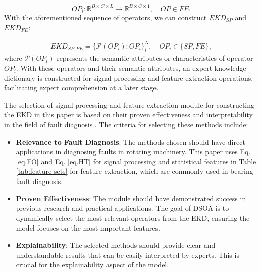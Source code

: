 \documentclass[lettersize,journal]{IEEEtran}
\begin{document}
\begin{equation}
    OP_i: \mathbb{R}^{B \times C \times L} \to \mathbb{R}^{B \times C \times 1}, \quad OP \in FE.
\end{equation}
With the aforementioned sequence of operators, we can construct $EKD_{SP}$ and $EKD_{FE}$:

\begin{equation}
\begin{split}
    EKD_{SP,FE} = 
    {\{\mathcal{P}(OP_i): OP_i}\}_i^{N}, \quad OP_i \in \{SP, FE\},
\end{split}
\end{equation}
where $\mathcal{P}(OP_i)$ represents the semantic attributes or characteristics of operator $OP_i$. With these operators and their semantic attributes, an expert knowledge dictionary is constructed for signal processing and feature extraction operations, facilitating expert comprehension at a later stage.

The selection of signal processing and feature extraction module for constructing the EKD in this paper is based on their proven effectiveness and interpretability in the field of fault diagnosis \cite{liDeepExpertNetwork2024, leiApplicationsMachineLearning2020d}. The criteria for selecting these methods include:

\begin{itemize}
    \item \textbf{Relevance to Fault Diagnosis}: The methods chosen should have direct applications in diagnosing faults in rotating machinery. This paper uses Eq. \ref{eq.FO} and Eq. \ref{eq.HT} for signal processing and statistical features in Table \ref{tab:feature sets} for feature extraction, which are commonly used in bearing fault diagnosis.
    \item \textbf{Proven Effectiveness}: The module should have demonstrated success in previous research and practical applications. The goal of DSOA is to dynamically select the most relevant operators from the EKD, ensuring the model focuses on the most important features.
    \item \textbf{Explainability}: The selected methods should provide clear and understandable results that can be easily interpreted by experts. This is crucial for the explainability aspect of the model.
\end{itemize}
\end{document}
